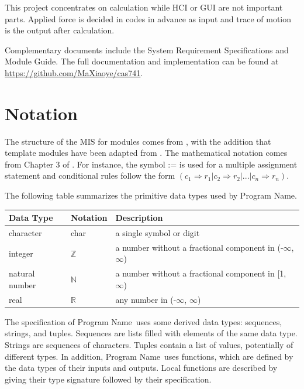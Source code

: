 \documentclass[12pt, titlepage]{article}
\newcommand{\progname}{Program Name}
\begin{document}
This project concentrates on calculation while
HCI or GUI are not important parts. Applied force is decided in codes in advance as input
and trace of motion is the output after calculation.

Complementary documents include the System Requirement Specifications
and Module Guide.  The full documentation and implementation can be
found at \url{https://github.com/MaXiaoye/cas741}.

\section{Notation}


The structure of the MIS for modules comes from \citet{HoffmanAndStrooper1995},
with the addition that template modules have been adapted from
\cite{GhezziEtAl2003}.  The mathematical notation comes from Chapter 3 of
\citet{HoffmanAndStrooper1995}.  For instance, the symbol := is used for a
multiple assignment statement and conditional rules follow the form $(c_1
\Rightarrow r_1 | c_2 \Rightarrow r_2 | ... | c_n \Rightarrow r_n )$.

The following table summarizes the primitive data types used by \progname. 

\begin{center}
\renewcommand{\arraystretch}{1.2}
\noindent 
\begin{tabular}{l l p{7.5cm}} 
\toprule 
\textbf{Data Type} & \textbf{Notation} & \textbf{Description}\\ 
\midrule
character & char & a single symbol or digit\\
integer & $\mathbb{Z}$ & a number without a fractional component in (-$\infty$, $\infty$) \\
natural number & $\mathbb{N}$ & a number without a fractional component in [1, $\infty$) \\
real & $\mathbb{R}$ & any number in (-$\infty$, $\infty$)\\
\bottomrule
\end{tabular} 
\end{center}

\noindent
The specification of \progname \ uses some derived data types: sequences, strings, and
tuples. Sequences are lists filled with elements of the same data type. Strings
are sequences of characters. Tuples contain a list of values, potentially of
different types. In addition, \progname \ uses functions, which
are defined by the data types of their inputs and outputs. Local functions are
described by giving their type signature followed by their specification.
\end{document}
